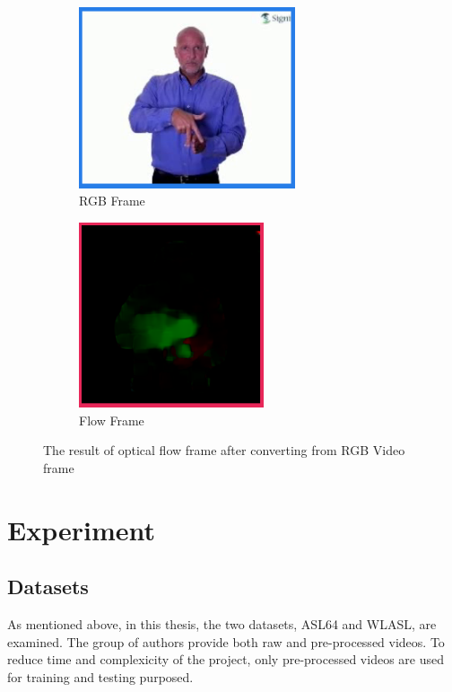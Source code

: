 \documentclass[a4paper, 12pt]{article}
\begin{document}
\begin{figure}[H]
    \centering
    \begin{subfigure}[b]{0.4\textwidth}
        \centering
        \includegraphics[width=0.7\textwidth]{rgb.png}
        \caption{RGB Frame}
    \end{subfigure}
    \hfill
    \begin{subfigure}[b]{0.4\textwidth}
        \centering
        \includegraphics[width=0.6\textwidth]{flow.png}
        \caption{Flow Frame}
    \end{subfigure}
    \caption{The result of optical flow frame after converting from RGB Video frame}
    \label{dense optical flow}
\end{figure}

\section{Experiment}
\subsection{Datasets}
As mentioned above, in this thesis, the two datasets, ASL64 and WLASL, are examined. The group of authors provide both raw and pre-processed videos. To reduce time and complexicity of the project, only pre-processed videos are used for training and testing purposed.
\end{document}
